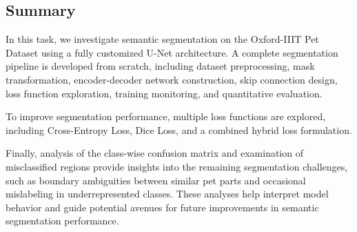 \subsection{Summary}
In this task, we investigate semantic segmentation on the Oxford-IIIT Pet Dataset using a fully customized U-Net architecture. A complete segmentation pipeline is developed from scratch, including dataset preprocessing, mask transformation, encoder-decoder network construction, skip connection design, loss function exploration, training monitoring, and quantitative evaluation.

To improve segmentation performance, multiple loss functions are explored, including Cross-Entropy Loss, Dice Loss, and a combined hybrid loss formulation. 

Finally, analysis of the class-wise confusion matrix and examination of misclassified regions provide insights into the remaining segmentation challenges, such as boundary ambiguities between similar pet parts and occasional mislabeling in underrepresented classes. These analyses help interpret model behavior and guide potential avenues for future improvements in semantic segmentation performance.
